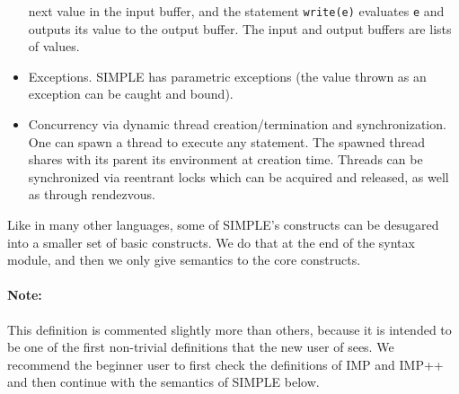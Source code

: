 \begin{kblock}[text]
\begin{itemize}
next value in the input buffer, and the statement \texttt{write(e)}
evaluates \texttt{e} and outputs its value to the output buffer.  The
input and output buffers are lists of values.
\item Exceptions.  SIMPLE has parametric exceptions (the value thrown as
an exception can be caught and bound).
\item Concurrency via dynamic thread creation/termination and
synchronization.  One can spawn a thread to execute any statement.
The spawned thread shares with its parent its environment at creation time.
Threads can be synchronized via reentrant locks which can be acquired and
released, as well as through rendezvous.

\end{itemize}
Like in many other languages, some of SIMPLE's constructs can be
desugared into a smaller set of basic constructs.  We do that at the end
of the syntax module, and then we only give semantics to the core constructs.

\paragraph{Note:}{
This definition is commented slightly more than others, because it is
intended to be one of the first non-trivial definitions that the new
user of \K sees.  We recommend the beginner user to first check the \K
definitions of IMP and IMP++ and then continue with the semantics of
SIMPLE below.}

\end{kblock}

\vspace*{3ex}
